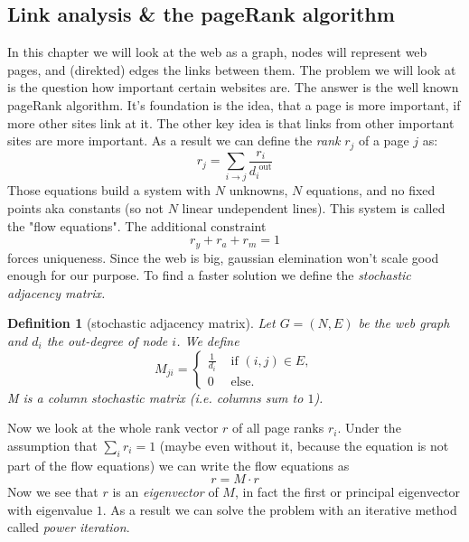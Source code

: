 \documentclass[]{article}
\newtheorem{defi}{Definition}
\begin{document}
\subsection{Link analysis \& the pageRank algorithm}
In this chapter we will look at the web as a graph, nodes will represent web pages, and (direkted) edges the links between them. The problem we will look at is the question how important certain websites are. The answer is the well known pageRank algorithm. It's foundation is the idea, that a page is more important, if more other sites link at it. The other key idea is that links from other important sites are more important. As a result we can define the \emph{rank} $r_j$ of a page $j$ as:
\[
	r_j = \sum_{i \rightarrow j}\frac{r_i}{d^{\text{ out}}_i}
\]
Those equations build a system with $N$ unknowns, $N$ equations, and no fixed points aka constants (so not $N$ linear undependent lines). This system is called the "flow equations". The additional constraint
\[
	r_y + r_a + r_m = 1
\]
forces uniqueness. Since the web is big, gaussian elemination won't scale good enough for our purpose. To find a faster solution we define the \emph{stochastic adjacency matrix.}

\begin{defi}[stochastic adjacency matrix]
Let $G = (N,E)$ be the web graph and $d_i$ the out-degree of node $i$. We define
\[
M_{ji} = \begin{cases}
\frac{1}{d_i} 	&\text{ if } (i,j) \in E, \\
0 				&\text{ else}.
\end{cases}
\]
M is a column stochastic matrix (i.e. columns sum to $1$).
\end{defi}
Now we look at the whole rank vector $r$ of all page ranks $r_i$. Under the assumption that $\sum_i r_i = 1$ (maybe even without it, because the equation is not part of the flow equations) we can write the flow equations as 
\[
	r = M \cdot r
\]
Now we see that $r$ is an \emph{eigenvector} of $M$, in fact the first or principal eigenvector with eigenvalue $1$. As a result we can solve the problem with an iterative method called \emph{power iteration}.
\end{document}
